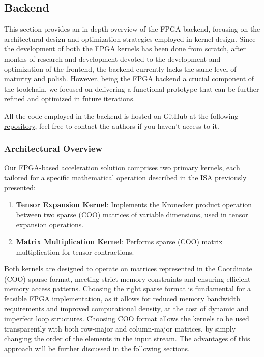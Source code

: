 \documentclass[12pt,oneside,a4paper]{article}
\begin{document}
\subsection{Backend}

This section provides an in-depth overview of the FPGA backend, focusing on the architectural design and optimization strategies employed in kernel design. Since the development of both the FPGA kernels has been done from scratch, after months of research and development devoted to the development and optimization of the frontend, the backend currently lacks the same level of maturity and polish. However, being the FPGA backend a crucial component of the toolchain, we focused on delivering a functional prototype that can be further refined and optimized in future iterations.

All the code employed in the backend is hosted on GitHub at the following \href{https://github.com/angelozangari/HPPS24-Tensor-Contraction-HLS}{repository}, feel free to contact the authors if you haven't access to it.

\subsubsection{Architectural Overview}

Our FPGA-based acceleration solution comprises two primary kernels, each tailored for a specific mathematical operation described in the ISA previously presented:

\begin{enumerate}
    \item \textbf{Tensor Expansion Kernel}: Implements the Kronecker product operation between two sparse (COO) matrices of variable dimensions, used in tensor expansion operations.
    \item \textbf{Matrix Multiplication Kernel}: Performs sparse (COO) matrix multiplication for tensor contractions.
\end{enumerate}

Both kernels are designed to operate on matrices represented in the Coordinate (COO) sparse format, meeting strict memory constraints and ensuring efficient memory access patterns. Choosing the right sparse format is fundamental for a feasible FPGA implementation\cite{FormatsHwSpMsurvey}, as it allows for reduced memory bandwidth requirements and improved computational density, at the cost of dynamic and imperfect loop structures. Choosing COO format allows the kernels to be used transparently with both row-major and column-major matrices, by simply changing the order of the elements in the input stream. The advantages of this approach will be further discussed in the following sections.
\end{document}
